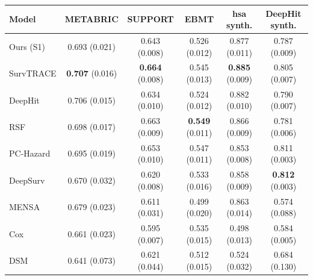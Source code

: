 \begin{tabular}{lccccc}
\toprule
Model & METABRIC & SUPPORT & EBMT & hsa synth. & DeepHit synth. \\
\midrule
Ours (S1) & 0.693 (0.021) & 0.643 (0.008) & 0.526 (0.012) & 0.877 (0.011) & 0.787 (0.009) \\
SurvTRACE & \textbf{0.707} (0.016) & \textbf{0.664} (0.008) & 0.545 (0.013) & \textbf{0.885} (0.009) & 0.805 (0.007) \\
DeepHit & 0.706 (0.015) & 0.634 (0.010) & 0.524 (0.012) & 0.882 (0.010) & 0.790 (0.007) \\
RSF & 0.698 (0.017) & 0.663 (0.009) & \textbf{0.549} (0.011) & 0.866 (0.009) & 0.781 (0.006) \\
PC-Hazard & 0.695 (0.019) & 0.653 (0.010) & 0.547 (0.011) & 0.853 (0.008) & 0.811 (0.003) \\
DeepSurv & 0.670 (0.032) & 0.620 (0.008) & 0.533 (0.016) & 0.858 (0.009) & \textbf{0.812} (0.003) \\
MENSA & 0.679 (0.023) & 0.611 (0.031) & 0.499 (0.020) & 0.863 (0.014) & 0.574 (0.088) \\
Cox & 0.661 (0.023) & 0.595 (0.007) & 0.535 (0.015) & 0.498 (0.013) & 0.584 (0.005) \\
DSM & 0.641 (0.073) & 0.621 (0.044) & 0.512 (0.015) & 0.524 (0.032) & 0.684 (0.130) \\
\bottomrule
\end{tabular}
